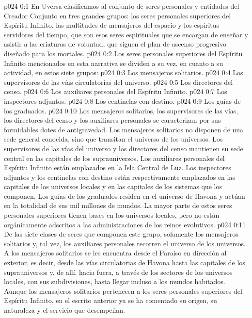 \author{Consejero divino}
\vs p024 0:1 En Uversa clasificamos al conjunto de seres personales y entidades del Creador Conjunto en tres grandes grupos: los seres personales superiores del Espíritu Infinito, las multitudes de mensajeros del espacio y los espíritus servidores del tiempo, que son esos seres espirituales que se encargan de enseñar y asistir a las criaturas de voluntad, que siguen el plan de ascenso progresivo diseñado para los mortales.
\vs p024 0:2 \pc Los seres personales superiores del Espíritu Infinito mencionados en esta narrativa se dividen a su vez, en cuanto a su actividad, en estos siete grupos:
\vs p024 0:3 Los mensajeros solitarios.
\vs p024 0:4 Los supervisores de las vías circulatorias del universo.
\vs p024 0:5 Los directores del censo.
\vs p024 0:6 Los auxiliares personales del Espíritu Infinito.
\vs p024 0:7 Los inspectores adjuntos.
\vs p024 0:8 Los centinelas con destino.
\vs p024 0:9 Los guías de los graduados.
\vs p024 0:10 \pc Los mensajeros solitarios, los supervisores de las vías, los directores del censo y los auxiliares personales se caracterizan por sus formidables dotes de antigravedad. Los mensajeros solitarios no disponen de una sede general conocida, sino que transitan el universo de los universos. Los supervisores de las vías del universo y los directores del censo mantienen su sede central en las capitales de los suprauniversos. Los auxiliares personales del Espíritu Infinito están emplazados en la Isla Central de Luz. Los inspectores adjuntos y los centinelas con destino están respectivamente emplazados en las capitales de los universos locales y en las capitales de los sistemas que los componen. Los guías de los graduados residen en el universo de Havona y actúan en la totalidad de sus mil millones de mundos. La mayor parte de estos seres personales superiores tienen bases en los universos locales, pero no están orgánicamente adscritos a las administraciones de los reinos evolutivos.
\vs p024 0:11 De las siete clases de seres que componen este grupo, solamente los mensajeros solitarios y, tal vez, los auxiliares personales recorren el universo de los universos. A los mensajeros solitarios se les encuentra desde el Paraíso en dirección al exterior, es decir, desde las vías circulatorias de Havona hasta las capitales de los suprauniversos y, de allí, hacia fuera, a través de los sectores de los universos locales, con sus subdivisiones, hasta llegar incluso a los mundos habitados. Aunque los mensajeros solitarios pertenecen a los seres personales superiores del Espíritu Infinito, en el escrito anterior ya se ha comentado su origen, su naturaleza y el servicio que desempeñan.
